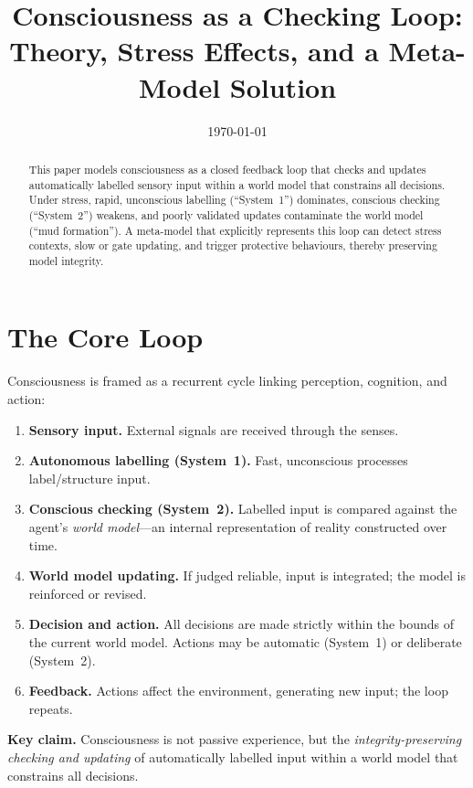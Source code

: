 \documentclass[11pt,a4paper]{article}
\title{\textbf{Consciousness as a Checking Loop:\\ Theory, Stress Effects, and a Meta-Model Solution}}
\author{}
\date{\today}
\begin{document}
\maketitle
\onehalfspacing

\begin{abstract}
This paper models consciousness as a closed feedback loop that checks and updates automatically labelled sensory input within a world model that constrains all decisions. Under stress, rapid, unconscious labelling (``System~1'') dominates, conscious checking (``System~2'') weakens, and poorly validated updates contaminate the world model (``mud formation''). A meta-model that explicitly represents this loop can detect stress contexts, slow or gate updating, and trigger protective behaviours, thereby preserving model integrity.
\end{abstract}

\section{The Core Loop}
Consciousness is framed as a recurrent cycle linking perception, cognition, and action:
\begin{enumerate}[label=\textbf{\arabic*.}]
  \item \textbf{Sensory input.} External signals are received through the senses.
  \item \textbf{Autonomous labelling (System~1).} Fast, unconscious processes label/structure input.
  \item \textbf{Conscious checking (System~2).} Labelled input is compared against the agent's \emph{world model}---an internal representation of reality constructed over time.
  \item \textbf{World model updating.} If judged reliable, input is integrated; the model is reinforced or revised.
  \item \textbf{Decision and action.} All decisions are made strictly within the bounds of the current world model. Actions may be automatic (System~1) or deliberate (System~2).
  \item \textbf{Feedback.} Actions affect the environment, generating new input; the loop repeats.
\end{enumerate}
\noindent
\textbf{Key claim.} Consciousness is not passive experience, but the \emph{integrity-preserving checking and updating} of automatically labelled input within a world model that constrains all decisions.
\end{document}
